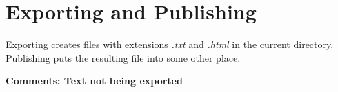 \section{Exporting and Publishing}

Exporting creates files with extensions {\it .txt\/} and {\it .html\/}
in the current directory.  Publishing puts the resulting file into
some other place.





%
%


{\bf Comments: Text not being exported}

